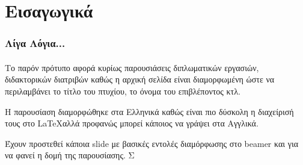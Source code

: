 \section{Εισαγωγικά}
 

\begin{frame}\frametitle{Λίγα Λόγια...}\framesubtitle{}
Το παρόν πρότυπο αφορά κυρίως παρουσιάσεις διπλωματικών εργασιών, διδακτορικών διατριβών καθώς η αρχική σελίδα είναι διαμορφωμένη ώστε να περιλαμβάνει το τίτλο του πτυχίου, το όνομα του επιβλέποντος κτλ.

Η παρουσίαση διαμορφώθηκε στα Ελληνικά καθώς είναι πιο δύσκολη η διαχείρισή τους στο \LaTeX  αλλά προφανώς μπορεί κάποιος να γράψει στα Αγγλικά. 

Έχουν προστεθεί κάποια slide με βασικές εντολές διαμόρφωσης στο beamer και για να φανεί η δομή της παρουσίασης. Σ

\end{frame}
\note{}
